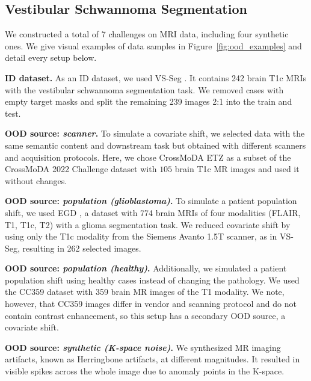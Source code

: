 %

%


\subsection{Vestibular Schwannoma Segmentation}

We constructed a total of 7 challenges on MRI data, including four synthetic ones. We give visual examples of data samples in Figure~\ref{fig:ood_examples} and detail every setup below. %


\textbf{ID dataset.} As an ID  dataset, we used VS-Seg \cite{shapey2021segmentation}. It contains 242 brain T1c MRIs with the vestibular schwannoma segmentation task. We removed cases with empty target masks and split the remaining 239 images 2:1 into the train and test.

\textbf{OOD source: \textit{scanner}.} To simulate a covariate shift, we selected data with the same semantic content and downstream task but obtained with different scanners and acquisition protocols. Here, we chose CrossMoDA ETZ as a subset of the CrossMoDA 2022 Challenge dataset \cite{reuben_dorent_2022_6504722} with $105$ brain T1c MR images and used it without changes.

\textbf{OOD source: \textit{population (glioblastoma)}.} To simulate a patient population shift, we used EGD \cite{van2021erasmus}, a dataset with 774 brain MRIs of four modalities (FLAIR, T1, T1c, T2) with a glioma segmentation task. We reduced covariate shift by using only the T1c modality from the Siemens Avanto 1.5T scanner, as in VS-Seg, resulting in 262 selected images.

\textbf{OOD source: \textit{population (healthy)}.} Additionally, we simulated a patient population shift using healthy cases instead of changing the pathology. We used the CC359 \cite{souza2018open} dataset with 359 brain MR images of the T1 modality. We note, however, that CC359 images differ in vendor and scanning protocol and do not contain contrast enhancement, so this setup has a secondary OOD source, a covariate shift.

\textbf{OOD source: \textit{synthetic (K-space noise)}.} We synthesized MR imaging artifacts, known as Herringbone artifacts, at different magnitudes. It resulted in visible spikes across the whole image due to anomaly points in the K-space. 

